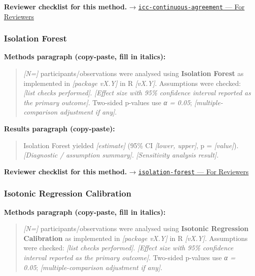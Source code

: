 \documentclass[
]{article}
\begin{document}
\textbf{Reviewer checklist for this method.} →
\href{../chapters/14-clinical/icc-continuous-agreement.Rmd\#for-reviewers}{\texttt{icc-continuous-agreement}
--- For Reviewers}

\subsubsection{Isolation Forest}\label{isolation-forest}

\textbf{Methods paragraph (copy-paste, fill in italics):}

\begin{quote}
\emph{{[}N={]}} participants/observations were analysed using
\textbf{Isolation Forest} as implemented in \emph{{[}package vX.Y{]}} in
R \emph{{[}vX.Y{]}}. Assumptions were checked: \emph{{[}list checks
performed{]}}. \emph{{[}Effect size with 95\% confidence interval
reported as the primary outcome{]}}. Two-sided p-values use \emph{α =
0.05}; \emph{{[}multiple-comparison adjustment if any{]}}.
\end{quote}

\textbf{Results paragraph (copy-paste):}

\begin{quote}
Isolation Forest yielded \emph{{[}estimate{]}} (95\% CI \emph{{[}lower,
upper{]}}, p = \emph{{[}value{]}}). \emph{{[}Diagnostic / assumption
summary{]}}. \emph{{[}Sensitivity analysis result{]}}.
\end{quote}

\textbf{Reviewer checklist for this method.} →
\href{../chapters/13-ml/isolation-forest.Rmd\#for-reviewers}{\texttt{isolation-forest}
--- For Reviewers}

\subsubsection{Isotonic Regression
Calibration}\label{isotonic-regression-calibration}

\textbf{Methods paragraph (copy-paste, fill in italics):}

\begin{quote}
\emph{{[}N={]}} participants/observations were analysed using
\textbf{Isotonic Regression Calibration} as implemented in
\emph{{[}package vX.Y{]}} in R \emph{{[}vX.Y{]}}. Assumptions were
checked: \emph{{[}list checks performed{]}}. \emph{{[}Effect size with
95\% confidence interval reported as the primary outcome{]}}. Two-sided
p-values use \emph{α = 0.05}; \emph{{[}multiple-comparison adjustment if
any{]}}.
\end{quote}
\end{document}
